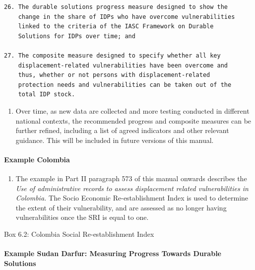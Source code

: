 \documentclass[
]{article}
\providecommand{\tightlist}{%
  \setlength{\itemsep}{0pt}\setlength{\parskip}{0pt}}
\begin{document}
\begin{verbatim}
26. The durable solutions progress measure designed to show the
    change in the share of IDPs who have overcome vulnerabilities
    linked to the criteria of the IASC Framework on Durable
    Solutions for IDPs over time; and

27. The composite measure designed to specify whether all key
    displacement-related vulnerabilities have been overcome and
    thus, whether or not persons with displacement-related
    protection needs and vulnerabilities can be taken out of the
    total IDP stock.
\end{verbatim}

\begin{enumerate}
\def\labelenumi{\arabic{enumi}.}
\setcounter{enumi}{441}
\tightlist
\item
  Over time, as new data are collected and more testing conducted in
  different national contexts, the recommended progress and composite
  measures can be further refined, including a list of agreed
  indicators and other relevant guidance. This will be included in
  future versions of this manual.
\end{enumerate}

\hypertarget{example-colombia-1}{%
\paragraph{Example Colombia}\label{example-colombia-1}}

\begin{enumerate}
\def\labelenumi{\arabic{enumi}.}
\setcounter{enumi}{442}
\tightlist
\item
  The example in Part II paragraph 573 of this manual onwards
  describes the \emph{Use of administrative records to assess displacement
  related vulnerabilities in Colombia.} The Socio Economic
  Re-establishment Index is used to determine the extent of their
  vulnerability, and are assessed as no longer having vulnerabilities
  once the SRI is equal to one.
\end{enumerate}

Box 6.2: Colombia Social Re-establishment Index

\hypertarget{example-sudan-darfur-measuring-progress-towards-durable-solutions-1}{%
\paragraph{Example Sudan Darfur: Measuring Progress Towards Durable Solutions}\label{example-sudan-darfur-measuring-progress-towards-durable-solutions-1}}
\end{document}
